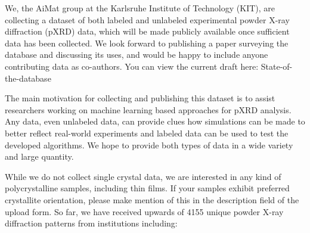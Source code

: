 



We, the AiMat group at the Karlsruhe Institute of Technology (KIT), are collecting a dataset of both labeled and unlabeled experimental powder X-ray diffraction (pXRD) data, which will be made publicly available once sufficient data has been collected. We look forward to publishing a paper surveying the database and discussing its uses, and would be happy to include anyone contributing data as co-authors. You can view the current draft here: State-of-the-database

The main motivation for collecting and publishing this dataset is to assist researchers working on machine learning based approaches for pXRD analysis. Any data, even unlabeled data, can provide clues how simulations can be made to better reflect real-world experiments and labeled data can be used to test the developed algorithms. We hope to provide both types of data in a wide variety and large quantity.

While we do not collect single crystal data, we are interested in any kind of polycrystalline samples, including thin films. If your samples exhibit preferred crystallite orientation, please make mention of this in the description field of the upload form. So far, we have received upwards of 4155 unique powder X-ray diffraction patterns from institutions including:



